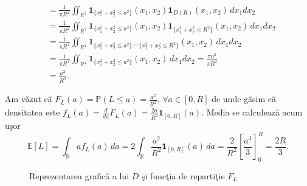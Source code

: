 \documentclass[]{article}
\def\1{{\mathbf 1}}
\def\RR{{\mathbb R}}
\def\PP{{\mathbb P}}
\def\EE{{\mathbb E}}
\begin{document}
\begin{enumerate}
\begin{align*}
                &= \frac{1}{\pi R^2}\iint_{\RR^2}\1_{\{x_1^2+x_2^2\leq a^2\}}(x_1,x_2)\1_{D(R)}(x_1,x_2)\,dx_1dx_2 \\
                &= \frac{1}{\pi R^2}\iint_{\RR^2}\1_{\{x_1^2+x_2^2\leq a^2\}}(x_1,x_2)\1_{\{x_1^2+x_2^2\leq R^2\}}(x_1,x_2)\,dx_1dx_2 \\
                &= \frac{1}{\pi R^2}\iint_{\RR^2}\1_{\{x_1^2+x_2^2\leq a^2\}\cap \{x_1^2+x_2^2\leq R^2\}}(x_1,x_2)\,dx_1dx_2\\
                &= \frac{1}{\pi R^2}\iint_{\RR^2}\1_{\{x_1^2+x_2^2\leq a^2\}}(x_1,x_2)\,dx_1dx_2 = \frac{\pi a^2}{\pi R^2}\\
                &= \frac{a^2}{R^2}.
    \end{align*}

Am v\u azut c\u a $F_L(a) = \PP(L\leq a) = \frac{a^2}{R^2},\, \forall a\in[0,R]$ de unde g\u asim c\u a densitatea este $f_L(a) = \frac{d}{da}F_L(a) = \frac{2a}{R^2}\1_{[0,R]}(a)$. Media se calculeaz\u a acum u\c sor
    \begin{equation*}
        \EE[L] = \int_{\RR}af_L(a)\,da = 2\int_{\RR}\frac{a^2}{R^2}\1_{[0,R]}(a)\,da = \frac{2}{R^2}\left[\frac{a^3}{3}\right]_{0}^{R} = \frac{2R}{3}.
    \end{equation*}
\end{enumerate}

\begin{figure}[ht]
\centering
{}
\quad
{}
%
\caption{Reprezentarea grafic\u a a lui $D$ \c si func\c tia de reparti\c tie $F_L$}
\label{Fig_ex3_t3}
\end{figure}
\end{document}
